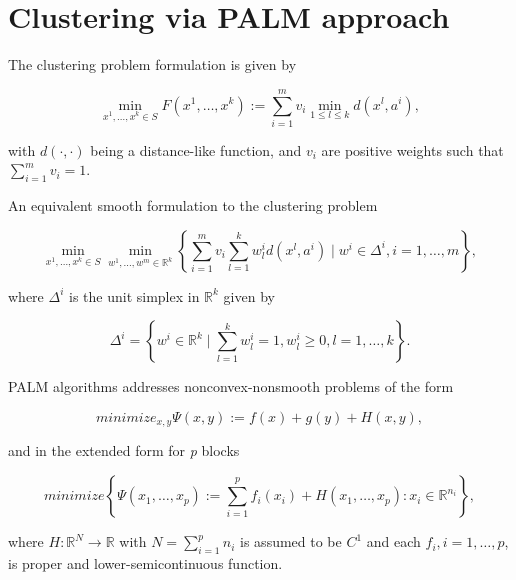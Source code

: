 \documentclass[11pt]{article}
\numberwithin{equation}{section}
\begin{document}
\section{Clustering via PALM approach }

The clustering problem formulation is given by

\begin{equation}
	\min\limits_{x^1, \dots ,x^k \in S} F(x^1, \dots ,x^k) := \sum\limits_{i=1}^{m} v_i \min\limits_{1 \le l \le k} d(x^l,a^i), \label{StateEq1}
\end{equation}

\noindent with $\textit{d}(\cdot ,\cdot)$ being a distance-like function, and $v_i$ are positive weights such that $\sum\limits_{i=1}^{m} v_i = 1$. 

An equivalent smooth formulation to the clustering problem

\begin{equation}
	\min\limits_{x^1, \dots ,x^k \in S} \min\limits_{w^1, \dots ,w^m \in \mathbb{R}^k} \left\lbrace \sum\limits_{i=1}^{m} v_i \sum\limits_{l=1}^{k} w^i_l d(x^l , a^i) \mid w^i \in \Delta^i , i=1, \dots ,m \right\rbrace , \label{StateEq2}
\end{equation}

\noindent where $\Delta^i$ is the unit simplex in $\mathbb{R}^k$ given by

\begin{equation}
	\Delta^i = \left\lbrace w^i \in \mathbb{R}^k \mid \sum\limits_{l=1}^{k} w^i_l =1, w^i_l \geq 0 , l=1, \dots ,k \right\rbrace .
\end{equation}

PALM algorithms addresses nonconvex-nonsmooth problems of the form

\begin{equation}
	minimize_{x,y} \Psi(x,y):=f(x)+g(y)+H(x,y) , \label{StateEq3}
\end{equation}

\noindent and in the extended form for \textit{p} blocks

\begin{equation}
	minimize\left\lbrace \Psi(x_1, \dots ,x_p):= \sum\limits_{i=1}^{p}f_i(x_i)+H(x_1, \dots ,x_p) : x_i \in \mathbb{R}^{n_i} \right\rbrace , \label{StateEq4}
\end{equation}

\noindent where $H : \mathbb{R}^N \rightarrow \mathbb{R}$ with $N= \sum^{p}_{i=1} n_i$ is assumed to be $C^1$ and each $f_i , i= 1, \dots ,p$, is proper and lower-semicontinuous function.
\end{document}
